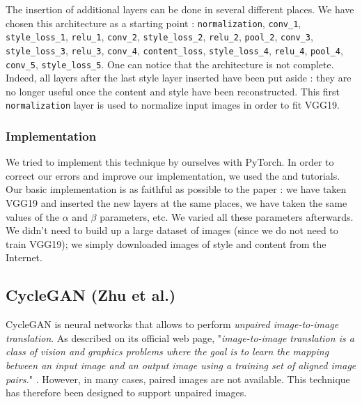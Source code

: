 \documentclass[twocolumn,superscriptaddress,aps, floatfix]{revtex4-1}
\begin{document}
    The insertion of additional layers can be done in several different places. We have chosen this architecture as a starting point : \texttt{normalization}, \texttt{conv\_1}, \texttt{style\_loss\_1}, \texttt{relu\_1}, \texttt{conv\_2}, \texttt{style\_loss\_2}, \texttt{relu\_2}, \texttt{pool\_2}, \texttt{conv\_3}, \texttt{style\_loss\_3}, \texttt{relu\_3}, \texttt{conv\_4}, \texttt{content\_loss}, \texttt{style\_loss\_4}, \texttt{relu\_4}, \texttt{pool\_4}, \texttt{conv\_5}, \texttt{style\_loss\_5}. One can notice that the architecture is not complete. Indeed, all layers after the last style layer inserted have been put aside : they are no longer useful once the content and style have been reconstructed. This first \texttt{normalization} layer is used to normalize input images in order to fit VGG19.
    
    \subsubsection{Implementation}
    
    We tried to implement this technique by ourselves with PyTorch. In order to correct our errors and improve our implementation, we used the \cite{pytorch.org} and \cite{nextjournal.com} tutorials. Our basic implementation is as faithful as possible to the paper \cite{DBLP:journals/corr/GatysEB15a} : we have taken VGG19 and inserted the new layers at the same places, we have taken the same values of the $\alpha$ and $\beta$ parameters, etc. We varied all these parameters afterwards. We didn't need to build up a large dataset of images (since we do not need to train VGG19); we simply downloaded images of style and content from the Internet.
    
    \subsection{CycleGAN (Zhu et al.)}\label{sec:methods.zhu}
    
    CycleGAN is neural networks that allows to perform \emph{unpaired image-to-image translation}. As described on its official web page, "\emph{image-to-image translation is a class of vision and graphics problems where the goal is to learn the mapping between an input image and an output image using a training set of aligned image pairs.}" \cite{junyanz.github.io}. However, in many cases, paired images are not available. This technique has therefore been designed to support unpaired images.\\
    
\end{document}
